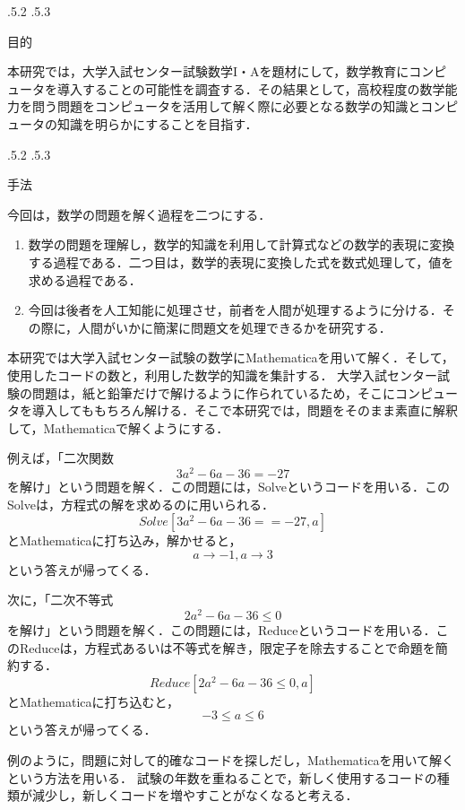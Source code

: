 \documentclass[uplatex,twocolumn]{jsarticle}
\makeatletter
\renewcommand{\section}{%
    \if@slide\clearpage\fi
    \@startsection{section}{1}{\z@}%
    {\Cvs \@plus.5\Cdp \@minus.2\Cdp}%
    {.5\Cvs \@plus.3\Cdp}%
    {\normalfont\raggedright}}
\makeatother
\begin{document}
\section{目的}

本研究では，大学入試センター試験数学I・Aを題材にして，数学教育にコンピュータを導入することの可能性を調査する．その結果として，高校程度の数学能力を問う問題をコンピュータを活用して解く際に必要となる数学の知識とコンピュータの知識を明らかにすることを目指す．





\section{手法}

今回は，数学の問題を解く過程を二つにする．
\begin{enumerate}
\item 数学の問題を理解し，数学的知識を利用して計算式などの数学的表現に変換する過程である．二つ目は，数学的表現に変換した式を数式処理して，値を求める過程である．
\item 今回は後者を人工知能に処理させ，前者を人間が処理するように分ける．その際に，人間がいかに簡潔に問題文を処理できるかを研究する．
\end{enumerate}
 
本研究では大学入試センター試験の数学にMathematicaを用いて解く．そして，使用したコードの数と，利用した数学的知識を集計する．
大学入試センター試験の問題は，紙と鉛筆だけで解けるように作られているため，そこにコンピュータを導入してももちろん解ける．そこで本研究では，問題をそのまま素直に解釈して，Mathematicaで解くようにする．

例えば，「二次関数\[3a^2 -6a-36=-27\]を解け」という問題を解く．この問題には，Solveというコードを用いる．このSolveは，方程式の解を求めるのに用いられる．\[Solve[3a^2 -6a-36==-27,a]\]とMathematicaに打ち込み，解かせると，\[{{a \rightarrow -1},{a \rightarrow 3}}\]という答えが帰ってくる．

次に，「二次不等式\[2a^2 -6a-36 \le 0\]を解け」という問題を解く．この問題には，Reduceというコードを用いる．このReduceは，方程式あるいは不等式を解き，限定子を除去することで命題を簡約する．\[Reduce[2a^2 -6a-36 \le 0,a]\]とMathematicaに打ち込むと，\[-3 \le a \le 6\]という答えが帰ってくる．

例のように，問題に対して的確なコードを探しだし，Mathematicaを用いて解くという方法を用いる．
試験の年数を重ねることで，新しく使用するコードの種類が減少し，新しくコードを増やすことがなくなると考える．
\end{document}
